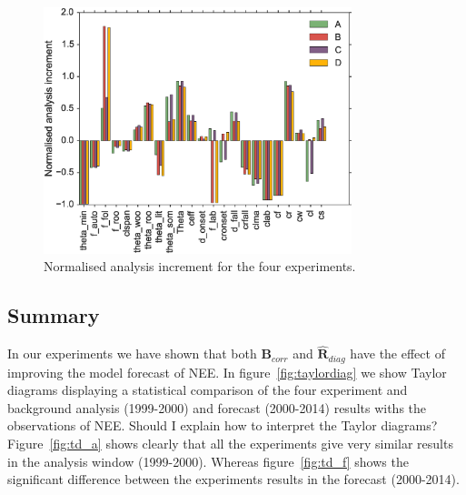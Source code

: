 \documentclass[11pt]{article}
\begin{document}
\begin{figure}[ht]
    \centering
    \includegraphics[width=0.8\textwidth]{inccvt.eps}
    \caption{Normalised analysis increment for the four experiments.}
    \label{fig:xa_inc}
\end{figure}

\subsection{Summary}

In our experiments we have shown that both $\textbf{B}_{corr}$ and $\hat{\textbf{R}}_{diag}$ have the effect of improving the model forecast of NEE. In figure~\ref{fig:taylordiag} we show Taylor diagrams displaying a statistical comparison of the four experiment and background analysis (1999-2000) and forecast (2000-2014) results withs the observations of NEE. {\color{red} Should I explain how to interpret the Taylor diagrams?} Figure~\ref{fig:td_a} shows clearly that all the experiments give very similar results in the analysis window (1999-2000). Whereas figure~\ref{fig:td_f} shows the significant difference between the experiments results in the forecast (2000-2014).
\end{document}
